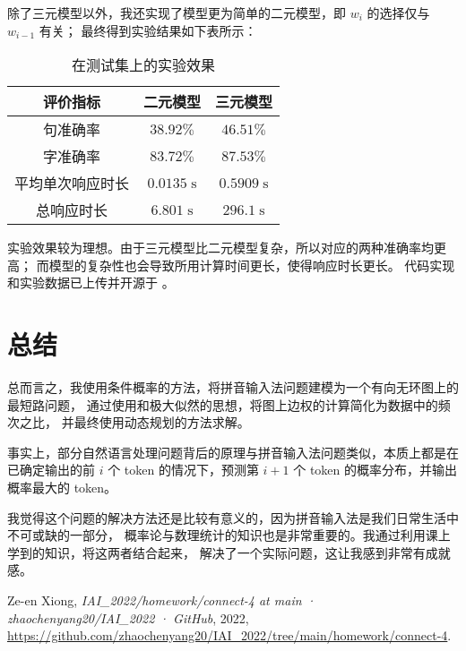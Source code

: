 \documentclass[UTF8]{ctexart}
\begin{document}
除了三元模型以外，我还实现了模型更为简单的二元模型，即 $w_i$ 的选择仅与 $w_{i-1}$ 有关；
最终得到实验结果如下表所示：
\begin{table}[H]
    \centering
    \begin{tabular}{||c||c|c||}
        \hline
        评价指标 & 二元模型 & 三元模型 \\
        \hline
        句准确率 & $38.92\%$ & $46.51\%$ \\
        字准确率 & $83.72\%$ & $87.53\%$ \\
        平均单次响应时长 & $0.0135\;\mathrm{s}$ & $0.5909\;\mathrm{s}$ \\
        总响应时长 & $6.801\;\mathrm{s}$ & $296.1\;\mathrm{s}$ \\
        \hline
    \end{tabular}
    \caption{在测试集上的实验效果}
\end{table}
实验效果较为理想。由于三元模型比二元模型复杂，所以对应的两种准确率均更高；
而模型的复杂性也会导致所用计算时间更长，使得响应时长更长。
代码实现和实验数据已上传并开源于 \cite{Pinyin}。

\section{总结}

总而言之，我使用条件概率的方法，将拼音输入法问题建模为一个有向无环图上的最短路问题，
通过使用和极大似然的思想，将图上边权的计算简化为数据中的频次之比，
并最终使用动态规划的方法求解。

事实上，部分自然语言处理问题背后的原理与拼音输入法问题类似，本质上都是在已确定输出的前 $i$ 个 token
的情况下，预测第 $i+1$ 个 token 的概率分布，并输出概率最大的 token。

我觉得这个问题的解决方法还是比较有意义的，因为拼音输入法是我们日常生活中不可或缺的一部分，
概率论与数理统计的知识也是非常重要的。我通过利用课上学到的知识，将这两者结合起来，
解决了一个实际问题，这让我感到非常有成就感。

\begin{thebibliography}{9}
    Ze-en Xiong,
    \emph{IAI\_2022/homework/connect-4 at main · zhaochenyang20/IAI\_2022 · GitHub},
    2022,
    \url{https://github.com/zhaochenyang20/IAI_2022/tree/main/homework/connect-4}.
\end{thebibliography}
\end{document}
